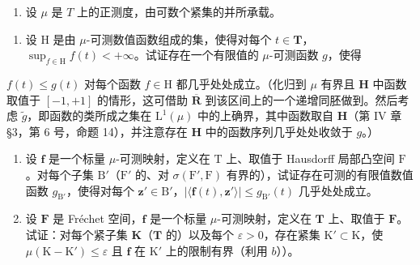 \begin{enumerate}
\def\labelenumi{\arabic{enumi})}
\setcounter{enumi}{22}
\tightlist
\item
  设 \(\mu\) 是 \(T\) 上的正测度，由可数个紧集的并所承载。
\end{enumerate}

\begin{enumerate}
\def\labelenumi{\alph{enumi})}
\tightlist
\item
  设 H 是由 \(\mu\)-可测数值函数组成的集，使得对每个 \(t \in \mathbf{T}\)，\(\sup_{f \in \mathrm{H}} f(t) < +\infty\)。试证存在一个有限值的 \(\mu\)-可测函数 \(g\)，使得
\end{enumerate}

\(f(t) \leqslant g(t)\) 对每个函数 \(f \in \mathrm{H}\) 都几乎处处成立。（化归到 \(\mu\) 有界且 \(\mathbf{H}\) 中函数取值于 \([-1, +1]\) 的情形，这可借助 \(\overline{\mathbf{R}}\) 到该区间上的一个递增同胚做到。然后考虑 \(\widetilde{g}\)，即函数的类所成之集在 \(\mathrm{L}^1(\mu)\) 中的上确界，其中函数取自 \(\mathbf{H}\)（第 IV 章 §3，第 6 号，命题 14），并注意存在 \(\mathbf{H}\) 中的函数序列几乎处处收敛于 \(g\)。）

\begin{enumerate}
\def\labelenumi{\alph{enumi})}
\setcounter{enumi}{1}
\item
  设 \(\mathbf{f}\) 是一个标量 \(\mu\)-可测映射，定义在 \(\mathrm{T}\) 上、取值于 Hausdorff 局部凸空间 \(\mathrm{F}\)。对每个子集 \(\mathrm{B}'\)（\(\mathrm{F}'\) 的、对 \(\sigma(\mathrm{F}',\mathrm{F})\) 有界的），试证存在可测的有限值数值函数 \(g_{\mathrm{B}'}\)，使得对每个 \(\mathbf{z}' \in \mathrm{B}'\)，\(|\langle \mathbf{f}(t),\mathbf{z}' \rangle| \leqslant g_{\mathrm{B}'}(t)\) 几乎处处成立。
\item
  设 \(\mathbf{F}\) 是 Fréchet 空间，\(\mathbf{f}\) 是一个标量 \(\mu\)-可测映射，定义在 \(\mathbf{T}\) 上、取值于 \(\mathbf{F}\)。试证：对每个紧子集 \(\mathbf{K}\)（\(\mathbf{T}\) 的）以及每个 \(\varepsilon > 0\)，存在紧集 \(\mathrm{K}' \subset \mathrm{K}\)，使 \(\mu(\mathrm{K} - \mathrm{K}') \leqslant \varepsilon\) 且 \(\mathbf{f}\) 在 \(\mathrm{K}'\) 上的限制有界（利用 \(b\)））。
\end{enumerate}

